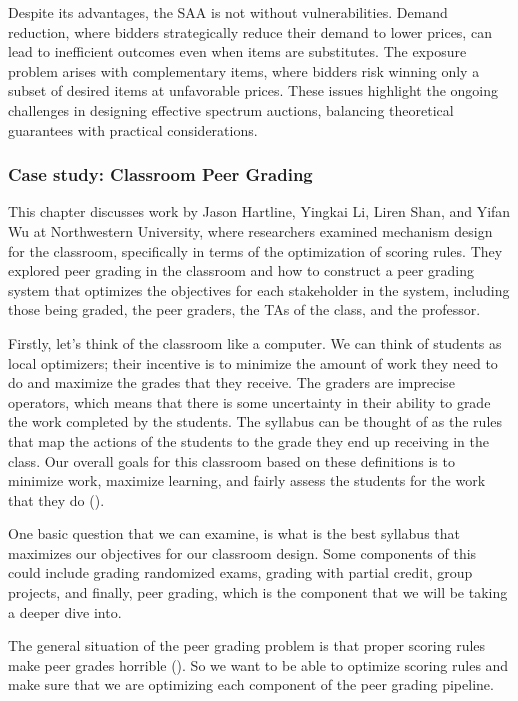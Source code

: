 \documentclass[
  letterpaper,
  DIV=11,
  numbers=noendperiod,
  oneside]{scrreprt}
\theoremstyle{remark}
\begin{document}
Despite its advantages, the SAA is not without vulnerabilities. Demand
reduction, where bidders strategically reduce their demand to lower
prices, can lead to inefficient outcomes even when items are
substitutes. The exposure problem arises with complementary items, where
bidders risk winning only a subset of desired items at unfavorable
prices. These issues highlight the ongoing challenges in designing
effective spectrum auctions, balancing theoretical guarantees with
practical considerations.

\subsubsection*{Case study: Classroom Peer
Grading}\label{case-study-classroom-peer-grading}

This chapter discusses work by Jason Hartline, Yingkai Li, Liren Shan,
and Yifan Wu at Northwestern University, where researchers examined
mechanism design for the classroom, specifically in terms of the
optimization of scoring rules. They explored peer grading in the
classroom and how to construct a peer grading system that optimizes the
objectives for each stakeholder in the system, including those being
graded, the peer graders, the TAs of the class, and the professor.

Firstly, let's think of the classroom like a computer. We can think of
students as local optimizers; their incentive is to minimize the amount
of work they need to do and maximize the grades that they receive. The
graders are imprecise operators, which means that there is some
uncertainty in their ability to grade the work completed by the
students. The syllabus can be thought of as the rules that map the
actions of the students to the grade they end up receiving in the class.
Our overall goals for this classroom based on these definitions is to
minimize work, maximize learning, and fairly assess the students for the
work that they do ().

One basic question that we can examine, is what is the best syllabus
that maximizes our objectives for our classroom design. Some components
of this could include grading randomized exams, grading with partial
credit, group projects, and finally, peer grading, which is the
component that we will be taking a deeper dive into.

The general situation of the peer grading problem is that proper scoring
rules make peer grades horrible (). So we want to be able to optimize scoring rules and make
sure that we are optimizing each component of the peer grading pipeline.
\end{document}
